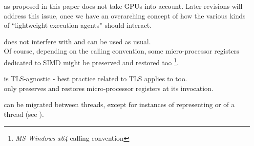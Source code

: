 \newpage
{}


\cc as proposed in this paper does not take GPUs into account. Later revisions
will address this issue, once we have an overarching concept of how the various
kinds of ``lightweight execution agents'' should interact.



does not interfere with \cc and can be used as usual.\\

Of course, depending on the calling convention, some micro-processor registers
dedicated to SIMD might be preserved and restored too
\footnote{\emph{MS Windows x64} calling convention}.



\cc is TLS-agnostic - best practice related to TLS applies to \cc too.\\

\cc only preserves and restores micro-processor registers at its invocation.



\cont can be migrated between threads, except for instances of
\cont representing \main or \entryfn of a thread (see ).
